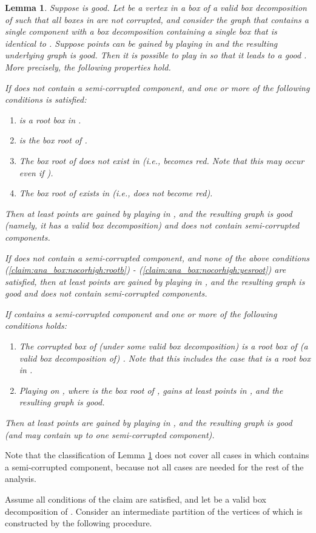 \documentclass[11pt]{article}
\def\Proof{\par\noindent{\bf Proof:~}}
\def\dnsitem{\vspace{-7pt}\item}
\def\dnssubitem{\vspace{-5pt}\item}
\newtheorem{lemma}[theorem]{Lemma}
\theoremstyle{definition}
\begin{document}
\begin{lemma}
\label{claim:ana_box}
Suppose  is good.
Let  be a vertex in a box  of a valid box decomposition  of  such that all boxes in  are not corrupted, 
and consider the graph  that contains a single component with a box decomposition  containing a single box  that is identical to .
Suppose  points can be gained by playing  in  and the resulting underlying graph  is good. 
Then it is possible to play  in  so that it leads to a good .
More precisely, the following properties hold.
\begin{description}
	\dnsitem[.]
	If  does not contain a semi-corrupted component, and one or more of the following conditions is satisfied:
	\begin{enumerate}
		\dnsitem 
		\label{claim:ana_box:nocorhigh:rootb}
		 is a root box in .
		\dnssubitem 
		\label{claim:ana_box:nocorhigh:boxr}
		 is the box root of .
		\dnssubitem 
		\label{claim:ana_box:nocorhigh:nodense}
		The box root  of  does not exist in  (i.e.,  becomes red. Note that this may occur even if ).
		\dnssubitem 
		\label{claim:ana_box:nocorhigh:yesroot}
		The box root  of  exists in  (i.e.,  does not become red).
	\end{enumerate}
	Then at least  points are gained by playing  in ,
	 and the resulting graph  is good (namely, it has a valid box decomposition) and does not contain semi-corrupted components.
	
	\dnsitem[.]
	If  does not contain a semi-corrupted component, and none of the above conditions (\ref{claim:ana_box:nocorhigh:rootb}) - (\ref{claim:ana_box:nocorhigh:yesroot}) are satisfied,
	then at least  points are gained by playing  in , 
	and the resulting graph is good and does not contain semi-corrupted components.

	\dnsitem[.]
	If  contains a semi-corrupted component  and one or more of the following conditions holds:
	\begin{enumerate}
		\dnsitem The corrupted box of  (under some valid box decomposition) is a root box of (a valid box decomposition of) . Note that this includes the case that  is a root box in .
		\dnssubitem Playing  on , where  is the box root of , gains at least  points in , and the resulting graph is good.
			\end{enumerate}
	Then at least  points are gained by playing  in ,
	 and the resulting graph is good (and may contain up to one semi-corrupted component).
\end{description}
\end{lemma}
Note that the classification of Lemma \ref{claim:ana_box} does not cover all cases in which  contains a semi-corrupted component, because not all cases are needed for the rest of the analysis.
\Proof
Assume all conditions of the claim are satisfied, and let  be a valid box decomposition of .
Consider an intermediate partition  of the vertices of  which is constructed by the following procedure.
\end{document}
